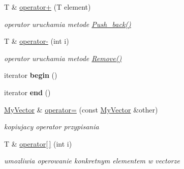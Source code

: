 \begin{DoxyCompactItemize}
\mbox{\label{class_my_vector_a2a00a04d857cd8ecd8ae7efc740a3d3f}} 
T \& \hyperlink{class_my_vector_a2a00a04d857cd8ecd8ae7efc740a3d3f}{operator+} (T element)
\begin{DoxyCompactList}\small\item\em operator uruchamia metode \hyperlink{class_my_vector_a9c0be74e27cccdde01b7e8de25062e3a}{Push\+\_\+back()} \end{DoxyCompactList}\item 
\mbox{\label{class_my_vector_aaee3d28509c0a749939522269db29082}} 
T \& \hyperlink{class_my_vector_aaee3d28509c0a749939522269db29082}{operator-\/} (int i)
\begin{DoxyCompactList}\small\item\em operator uruchamia metode \hyperlink{class_my_vector_accc75234d364f6e2356186472fd2f3d0}{Remove()} \end{DoxyCompactList}\item 
\mbox{\label{class_my_vector_a0fb8031b4a31dc8066145ef1d96e2a5f}} 
iterator {\bfseries begin} ()
\item 
\mbox{\label{class_my_vector_a449b6a8739856b54f9551f914022fb76}} 
iterator {\bfseries end} ()
\item 
\mbox{\label{class_my_vector_a2bb6f5120b11fe6573f193247b9bc155}} 
\hyperlink{class_my_vector}{My\+Vector} \& \hyperlink{class_my_vector_a2bb6f5120b11fe6573f193247b9bc155}{operator=} (const \hyperlink{class_my_vector}{My\+Vector} \&other)
\begin{DoxyCompactList}\small\item\em kopiujacy operator przypisania \end{DoxyCompactList}\item 
\mbox{\label{class_my_vector_a3c79a753f0955808c6e97e574a2f3496}} 
T \& \hyperlink{class_my_vector_a3c79a753f0955808c6e97e574a2f3496}{operator\mbox{[}$\,$\mbox{]}} (int i)
\begin{DoxyCompactList}\small\item\em umozliwia operowanie konkretnym elementem w vectorze \end{DoxyCompactList}\item 
\mbox{\label{class_my_vector_a626cb4a9b2bae47d8752a3b82c413a4d}} 

\end{DoxyCompactItemize}

